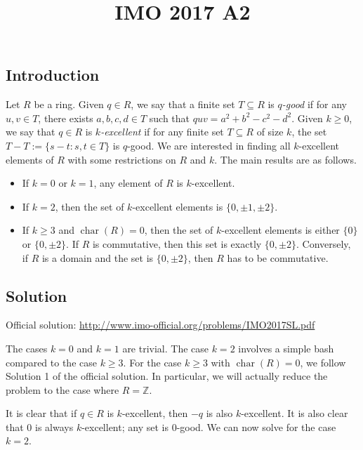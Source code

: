 \documentclass{article}
\title{IMO 2017 A2}
\author{}
\date{}
\newcommand{\Z}{\mathbb{Z}}
\DeclareMathOperator{\rchar}{char}
\begin{document}
\maketitle



\subsection*{Introduction}

Let $R$ be a ring.
Given $q \in R$, we say that a finite set $T \subseteq R$ is \emph{$q$-good} if for any $u, v \in T$, there exists $a, b, c, d \in T$ such that $quv = a^2 + b^2 - c^2 - d^2$.
Given $k \geq 0$, we say that $q \in R$ is \emph{$k$-excellent} if for any finite set $T \subseteq R$ of size $k$, the set $T - T := \{s - t : s, t \in T\}$ is $q$-good.
We are interested in finding all $k$-excellent elements of $R$ with some restrictions on $R$ and $k$.
The main results are as follows.

\begin{itemize}
    \item   If $k = 0$ or $k = 1$, any element of $R$ is $k$-excellent.
    \item   If $k = 2$, then the set of $k$-excellent elements is $\{0, \pm 1, \pm 2\}$.
    \item   If $k \geq 3$ and $\rchar(R) = 0$, then the set of $k$-excellent elements is either $\{0\}$ or $\{0, \pm 2\}$.
            If $R$ is commutative, then this set is exactly $\{0, \pm 2\}$.
            Conversely, if $R$ is a domain and the set is $\{0, \pm 2\}$, then $R$ has to be commutative.
\end{itemize}



\subsection*{Solution}

Official solution: \url{http://www.imo-official.org/problems/IMO2017SL.pdf}

The cases $k = 0$ and $k = 1$ are trivial.
The case $k = 2$ involves a simple bash compared to the case $k \geq 3$.
For the case $k \geq 3$ with $\rchar(R) = 0$, we follow Solution 1 of the official solution.
In particular, we will actually reduce the problem to the case where $R = \Z$.

It is clear that if $q \in R$ is $k$-excellent, then $-q$ is also $k$-excellent.
It is also clear that $0$ is always $k$-excellent; any set is $0$-good.
We can now solve for the case $k = 2$.
\end{document}
